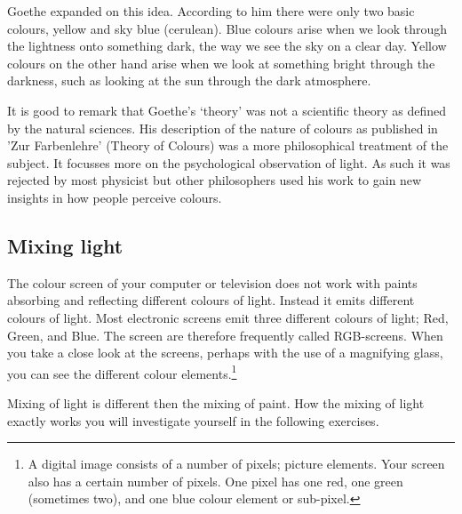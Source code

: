Goethe expanded on this idea. According to him there were only two basic colours, yellow and sky blue (cerulean). Blue colours arise when we look through the lightness onto something dark, the way we see the sky on a clear day. Yellow colours on the other hand arise when we look at something bright through the darkness, such as looking at the sun through the dark atmosphere.

It is good to remark that Goethe's `theory' was not a scientific theory as defined by the natural sciences. His description of the nature of colours as published in 'Zur Farbenlehre' (Theory of Colours) was a more philosophical treatment of the subject. It focusses more on the psychological observation of light. As such it was rejected by most physicist but other philosophers used his work to gain new insights in how people perceive colours.

\subsection{Mixing light}
The colour screen of your computer or television does not work with paints absorbing and reflecting different colours of light. Instead it emits different colours of light. Most electronic screens emit three different colours of light; Red, Green, and Blue. The screen are therefore frequently called RGB-screens. When you take a close look at the screens, perhaps with the use of a magnifying glass, you can see the different colour elements.\footnote{A digital image consists of a number of pixels; picture elements. Your screen also has a certain number of pixels. One pixel has one red, one green (sometimes two), and one blue colour element or sub-pixel.}

Mixing of light is different then the mixing of paint. How the mixing of light exactly works you will investigate yourself in the following exercises.

